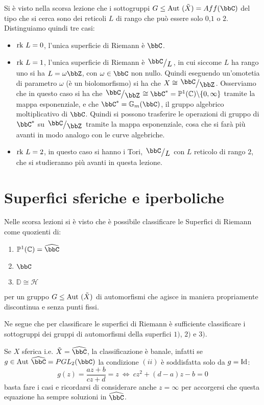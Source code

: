 Si è visto nella scorsa lezione che i sottogruppi $G\le\Aut(\tilde{X})=Aff(\bbC)$ del tipo che si cerca sono dei reticoli $L$ di rango che può essere solo $0$,$1$ o $2$. Distinguiamo quindi tre casi:
\begin{itemize}
\item $\mbox{rk } L=0$, l'unica superficie di Riemann è $\bbC$.
\item $\mbox{rk } L=1$, l'unica superficie di Riemann è $\quotient{\bbC}{L}$, in cui siccome $L$ ha rango uno si ha $L=\omega \bbZ$, con $\omega\in\bbC$ non nullo. Quindi eseguendo un'omotetia di parametro $\omega$ (è un biolomorfismo) si ha che $X\cong \quotient{\bbC}{\bbZ}$.
Osserviamo che in questo caso si ha che $\quotient{\bbC}{\bbZ}\cong \bbC^{*}=\mathbb{P}^1(\mathbb{C})\minus\{0,\infty\}$ tramite la mappa esponenziale, e che $\bbC^{*}=\mathbb{G}_m(\bbC)$, il gruppo algebrico moltiplicativo di $\bbC$. Quindi si possono trasferire le operazioni di gruppo di $\bbC^{*}$ su $\quotient{\bbC}{\bbZ}$ tramite la mappa esponenziale, cosa che si farà più avanti in modo analogo con le curve algebriche.
\item $\mbox{rk } L=2$, in questo caso si hanno i Tori, $\quotient{\bbC}{L}$ con $L$ reticolo di rango $2$, che si studieranno più avanti in questa lezione.
\end{itemize}

\section{Superfici sferiche e iperboliche}


Nelle scorsa lezioni si è visto che è possibile classificare le Superfici di Riemann come quozienti di:
\begin{enumerate}
\item $\mathbb{P}^1(\mathbb{C})=\hat{\bbC}$
\item $\bbC$
\item $\mathbb{D} \cong \mathcal{H}$
\end{enumerate}
per un gruppo $G\le\text{Aut }(\tilde{X})$ di automorfismi che agisce in maniera propriamente discontinua e senza punti fissi.

Ne segue che per classificare le superfici di Riemann è sufficiente classificare i sottogruppi dei gruppi di automorfismi della superfici $1)$, $2)$ e $3)$.

Se $X$ sferica i.e. $\tilde {X}=\hat{\bbC}$, la classificazione è banale, infatti se $g\in\Aut{\hat{\bbC}}=PGL_2(\bbC)$ la condizione $(ii)$ è soddisfatta solo da $g=\text{Id}$:
$$
g(z)=\frac{az+b}{cz+d}=z\ \Leftrightarrow\ cz^2+(d-a)z-b=0
$$
basta fare i casi e ricordarsi di considerare anche $z=\infty$ per accorgersi che questa equazione ha sempre soluzioni in $\hat{\bbC}$.


